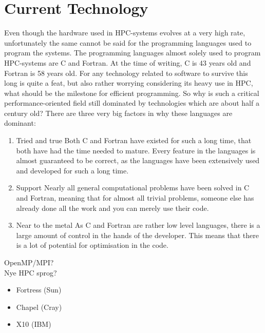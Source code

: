 \section{Current Technology}
Even though the hardware used in HPC-systems evolves at a very high rate, unfortunately the same cannot be said for the programming languages used to program the systems. The programming languages almost solely used to program HPC-systems are C and Fortran. At the time of writing, C is 43 years old and Fortran is 58 years old. For any technology related to software to survive this long is quite a feat, but also rather worrying considering its heavy use in HPC, what should be the milestone for efficient programming. 
So why is such a critical performance-oriented field still dominated by technologies which are about half a century old? There are three very big factors in why these languages are dominant:
\begin{enumerate}
	\item Tried and true
	Both C and Fortran have existed for such a long time, that both have had the time needed to mature. Every feature in the languages is almost guaranteed to be correct, as the languages have been extensively used and developed for such a long time.
	\item Support
	Nearly all general computational problems have been solved in C and Fortran, meaning that for almost all trivial problems, someone else has already done all the work and you can merely use their code.
	\item Near to the metal
	As C and Fortran are rather low level languages, there is a large amount of control in the hands of the developer. This means that there is a lot of potential for optimisation in the code.
\end{enumerate}

OpenMP/MPI?\\
Nye HPC sprog?
\begin{itemize}
	\item Fortress (Sun)
	\item Chapel (Cray)
	\item X10 (IBM)
\end{itemize}
